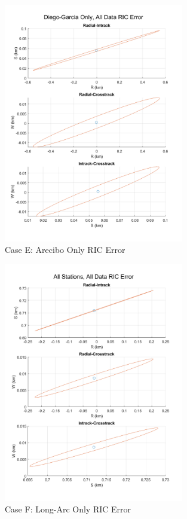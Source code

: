 \documentclass[conf]{new-aiaa}
\begin{document}
\begin{figure}[H]
	\centering
	\includegraphics[width=0.7\textwidth]{caseD_RICerr.png}
	\caption{Case E: Arecibo Only RIC Error}
\end{figure}

\begin{figure}[H]
	\centering
	\includegraphics[width=0.7\textwidth]{caseF_RICerr.png}
	\caption{Case F: Long-Arc Only RIC Error}
\end{figure}
\end{document}
